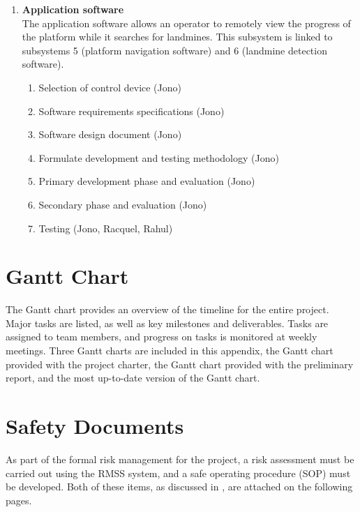\documentclass[main.tex]{subfiles}
\begin{document}
\begin{appendices}
{\begin{enumerate}
\item \textbf{Application software}\\
The application software allows an operator to remotely view the progress of the platform while it searches for landmines. This subsystem is linked to subsystems 5 (platform navigation software) and 6 (landmine detection software).
    \begin{enumerate}[label*=\arabic*.]
    \item Selection of control device (Jono)
    \item Software requirements specifications (Jono)
    \item Software design document (Jono)
    \item Formulate development and testing methodology (Jono)
    \item Primary development phase and evaluation (Jono)
    \item Secondary phase and evaluation (Jono)
    \item Testing (Jono, Racquel, Rahul)
    \end{enumerate}
\end{enumerate}}

\chapter{Gantt Chart}
The Gantt chart provides an overview of the timeline for the entire project. Major tasks are listed, as well as key milestones and deliverables. Tasks are assigned to team members, and progress on tasks is monitored at weekly meetings. Three Gantt charts are included in this appendix, the Gantt chart provided with the project charter, the Gantt chart provided with the preliminary report, and the most up-to-date version of the Gantt chart.




\chapter{Safety Documents}
As part of the formal risk management for the project, a risk assessment must be carried out using the RMSS system, and a safe operating  procedure (SOP) must be developed. Both of these items, as discussed in , are attached on the following pages.




\end{appendices}
\end{document}
